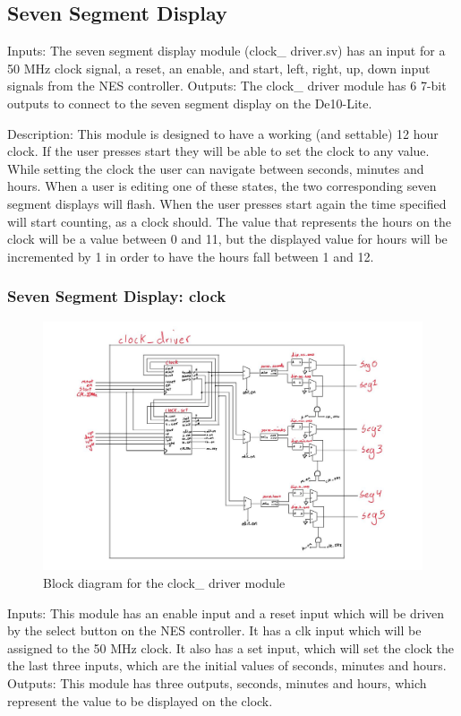 \documentclass[a4paper]{article}
\begin{document}
\subsection{Seven Segment Display}
Inputs: The seven segment display module (clock\_ driver.sv) has an input for a 50 MHz clock signal, a reset, an enable, and start, left, right, up, down input signals from the NES controller.
Outputs: The clock\_ driver module has 6 7-bit outputs to connect to the seven segment display on the De10-Lite.

Description: This module is designed to have a working (and settable) 12 hour clock. If the user presses start they will be able to set the clock to any value. While setting the clock the user can navigate between seconds, minutes and hours. When a user is editing one of these states, the two corresponding seven segment displays will flash. When the user presses start again the time specified will start counting, as a clock should. The value that represents the hours on the clock will be a value between 0 and 11, but the displayed value for hours will be incremented by 1 in order to have the hours fall between 1 and 12.

\subsubsection{Seven Segment Display: clock}
\begin{figure}[H]
    \includegraphics[width=0.8 \linewidth]{images/clockdriver.JPG}
    \caption{Block diagram for the clock\_ driver module}
    \label{clockdriver}
\end{figure}

Inputs: This module has an enable input and a reset input which will be driven by the select button on the NES controller. It has a clk input which will be assigned to the 50 MHz clock. It also has a set input, which will set the clock the the last three inputs, which are the initial values of seconds, minutes and hours.
Outputs: This module has three outputs, seconds, minutes and hours, which represent the value to be displayed on the clock.
\end{document}
